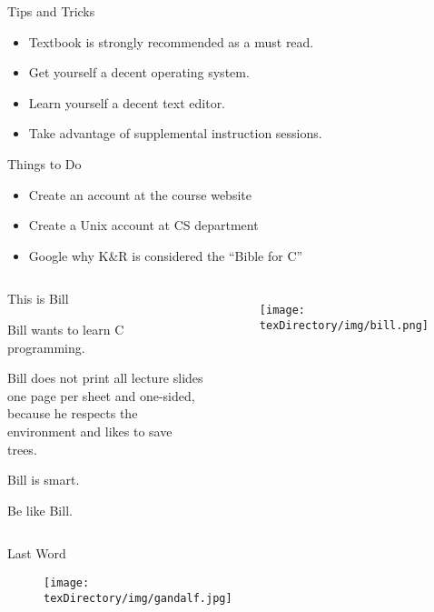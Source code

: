 \documentclass[compress]{beamer}
\begin{document}
\begin{slide}
	\begin{block}{Tips and Tricks}

	\begin{itemize}
	\item[] Textbook is strongly recommended as a must read.
	\item[] Get yourself a decent operating system.
	\item[] Learn yourself a decent text editor.
	\item[] Take advantage of supplemental instruction sessions.
	\end{itemize}

	\end{block}
\end{slide}

\begin{slide}
	\begin{block}{Things to Do}

	\begin{itemize}
	\item[] Create an account at the course website
	\item[] Create a Unix account at CS department
	\item[] Google why K\&R is considered the ``Bible for C''
	\end{itemize}

	\end{block}
\end{slide}

\begin{slide}
	\begin{columns}
	\begin{block}{This is Bill}

	Bill wants to learn C programming.

	Bill does not print all lecture slides one page per sheet and one-sided, because he respects the environment and likes to save trees.

	Bill is smart.

	Be like Bill.

	\end{block}
	\begin{figure}
	\texttt{[image: \\texDirectory/img/bill.png]}
	\end{figure}
	\end{columns}
\end{slide}

\begin{slide}
	\begin{block}{Last Word}

	\begin{figure}
	\texttt{[image: \\texDirectory/img/gandalf.jpg]}
	\end{figure}

	\end{block}
\end{slide}
\end{document}

